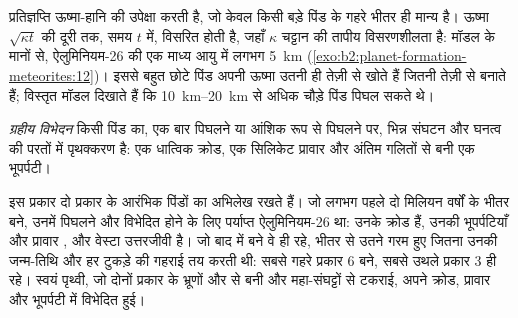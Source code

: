 \begin{omfigure}
\par{}
\end{omfigure}

प्रतिज्ञप्ति ऊष्मा-हानि की उपेक्षा करती है, जो केवल किसी बड़े पिंड के गहरे भीतर ही मान्य है।
ऊष्मा $\sqrt{\kappa t}$ की दूरी तक, समय $t$ में, विसरित होती है, जहाँ
$\kappa$ चट्टान की तापीय विसरणशीलता है: मॉडल के मानों से,
ऐलुमिनियम-26 की एक माध्य आयु में लगभग \qty{5}{km} (\cref{exo:b2:planet-formation-meteorites:12})। इससे बहुत
छोटे पिंड अपनी ऊष्मा उतनी ही तेज़ी से खोते हैं जितनी तेज़ी से बनाते हैं; विस्तृत मॉडल दिखाते हैं
कि \qtyrange{10}{20}{km} से अधिक चौड़े पिंड पिघल सकते थे।

\begin{definition}[ग्रहीय विभेदन]
\label{def:b2:planet-formation-meteorites:differentiation}
\emph{ग्रहीय विभेदन} किसी पिंड का, एक बार
पिघलने या आंशिक रूप से पिघलने पर, भिन्न संघटन और घनत्व की परतों में पृथक्करण है:
एक धात्विक क्रोड, एक सिलिकेट प्रावार और अंतिम गलितों से बनी
एक भूपर्पटी।
\end{definition}

इस प्रकार  दो प्रकार के आरंभिक पिंडों का अभिलेख रखते हैं। जो लगभग पहले दो
मिलियन वर्षों के भीतर बने, उनमें पिघलने और विभेदित होने के लिए पर्याप्त ऐलुमिनियम-26
था: उनके क्रोड  हैं, उनकी भूपर्पटियाँ और प्रावार
, और वेस्टा उत्तरजीवी है। जो बाद में बने वे  ही
रहे, भीतर से उतने गरम हुए जितना उनकी जन्म-तिथि और हर टुकड़े की
गहराई तय करती थी: सबसे गहरे प्रकार 6 बने, सबसे उथले प्रकार 3 ही
रहे। स्वयं पृथ्वी, जो दोनों प्रकार के भ्रूणों और  से बनी और
महा-संघट्टों से टकराई, अपने क्रोड, प्रावार और भूपर्पटी में विभेदित हुई।

